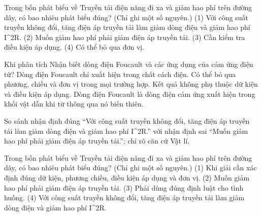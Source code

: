 \begin{ex}
Trong bốn phát biểu về Truyền tải điện năng đi xa và giảm hao phí trên đường dây, có bao nhiêu phát biểu đúng? (Chỉ ghi một số nguyên.) (1) Với công suất truyền không đổi, tăng điện áp truyền tải làm giảm dòng điện và giảm hao phí I^2R. (2) Muốn giảm hao phí phải giảm điện áp truyền tải. (3) Cần kiểm tra điều kiện áp dụng. (4) Có thể bỏ qua đơn vị.
\end{ex}

\begin{ex}
Khi phân tích Nhận biết dòng điện Foucault và các ứng dụng của cảm ứng điện từ?
\choice
{Dòng điện Foucault chỉ xuất hiện trong chất cách điện.}
{Có thể bỏ qua phương, chiều và đơn vị trong mọi trường hợp.}
{Kết quả không phụ thuộc dữ kiện và điều kiện áp dụng.}
{\True Dòng điện Foucault là dòng điện cảm ứng xuất hiện trong khối vật dẫn khi từ thông qua nó biến thiên.}
\end{ex}

\begin{bt}
So sánh nhận định đúng “Với công suất truyền không đổi, tăng điện áp truyền tải làm giảm dòng điện và giảm hao phí I^2R.” với nhận định sai “Muốn giảm hao phí phải giảm điện áp truyền tải.”; chỉ rõ căn cứ Vật lí.
\end{bt}

\begin{ex}
Trong bốn phát biểu về Truyền tải điện năng đi xa và giảm hao phí trên đường dây, có bao nhiêu phát biểu đúng? (Chỉ ghi một số nguyên.) (1) Khi giải cần xác định đúng dữ kiện, phương chiều, điều kiện áp dụng và đơn vị. (2) Muốn giảm hao phí phải giảm điện áp truyền tải. (3) Phải dùng đúng định luật cho tình huống. (4) Với công suất truyền không đổi, tăng điện áp truyền tải làm giảm dòng điện và giảm hao phí I^2R.
\end{ex}

